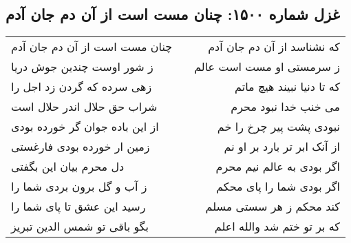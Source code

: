 \begin{center}
\section*{غزل شماره ۱۵۰۰: چنان مست است از آن دم جان آدم}
\label{sec:1500}
\begin{longtable}{l p{0.5cm} r}
چنان مست است از آن دم جان آدم
&&
که نشناسد از آن دم جان آدم
\\
ز شور اوست چندین جوش دریا
&&
ز سرمستی او مست است عالم
\\
زهی سرده که گردن زد اجل را
&&
که تا دنیا نبیند هیچ ماتم
\\
شراب حق حلال اندر حلال است
&&
می خنب خدا نبود محرم
\\
از این باده جوان گر خورده بودی
&&
نبودی پشت پیر چرخ را خم
\\
زمین ار خورده بودی فارغستی
&&
از آنک ابر تر بارد بر او نم
\\
دل محرم بیان این بگفتی
&&
اگر بودی به عالم نیم محرم
\\
ز آب و گل برون بردی شما را
&&
اگر بودی شما را پای محکم
\\
رسید این عشق تا پای شما را
&&
کند محکم ز هر سستی مسلم
\\
بگو باقی تو شمس الدین تبریز
&&
که بر تو ختم شد والله اعلم
\\
\end{longtable}
\end{center}
